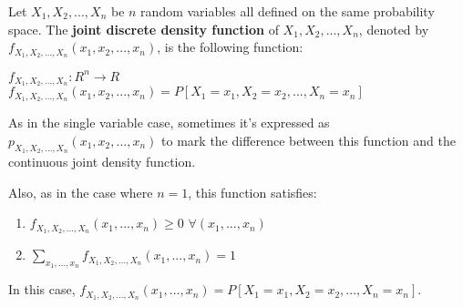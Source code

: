 \documentclass{article}
\begin{document}

Let $X_1, X_2, ..., X_n$ be $n$ random variables all defined on the same probability space. The \textbf{joint discrete density function} of $X_1, X_2, ..., X_n$, denoted by $f_{X_1, X_2, ..., X_n}(x_1,x_2,...,x_n)$, is the following function:\\
\par
$f_{X_1, X_2, ..., X_n}: R^n \to R$\\
$f_{X_1, X_2, ..., X_n}(x_1,x_2,...,x_n) = P[X_1 = x_1, X_2 = x_2, ... , X_n = x_n]$\\
\par
As in the single variable case, sometimes it's expressed as $p_{X_1, X_2, ..., X_n}(x_1,x_2,...,x_n)$ to mark the difference between this function and the continuous joint density function.\\
\par
Also, as in the case where $n=1$, this function satisfies:\\
\par
\begin{enumerate}
\item $f_{X_1, X_2, ..., X_n}(x_1,...,x_n) \geq  0$    $\forall (x_1,...,x_n)$
\item $\sum_{x_1, ... ,x_n}^{} {  f_{X_1, X_2, ..., X_n}(x_1,...,x_n) }= 1$
\end{enumerate}
\par
In this case, $f_{X_1, X_2, ..., X_n}(x_1,...,x_n) = P[ X_1 = x_1, X_2 = x_2, ... , X_n = x_n ]$.
\end{document}
